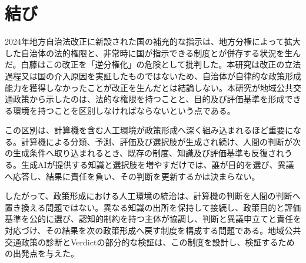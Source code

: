\section{結び}
\label{sec:ch10_conclusion}

2024年地方自治法改正に新設された国の補充的な指示は、地方分権によって拡大した自治体の法的権限と、非常時に国が指示できる制度とが併存する状況を生んだ\cite{chihojichiho2024,sangiin2024localgov}。白藤はこの改正を「逆分権化」の危険として批判した\cite{jichiken2024chihojichiho}。本研究は改正の立法過程又は国の介入原因を実証したものではないため、自治体が自律的な政策形成能力を獲得しなかったことが改正を生んだとは結論しない。本研究が地域公共交通政策から示したのは、法的な権限を持つことと、目的及び評価基準を形成できる環境を持つことを区別しなければならないという点である。

この区別は、計算機を含む人工環境が政策形成へ深く組み込まれるほど重要になる。計算機による分類、予測、評価及び選択肢が生成され続け、人間の判断が次の生成条件へ取り込まれるとき、既存の制度、知識及び評価基準も反復されうる。生成AIが提供する知識と選択肢を増やすだけでは、誰が目的を選び、異議へ応答し、結果に責任を負い、その判断を更新するかは決まらない。

したがって、政策形成における人工環境の統治は、計算機の判断を人間の判断へ置き換える問題ではない。異なる知識の出所を保持して接続し、政策目的と評価基準を公的に選び、認知的制約を持つ主体が協調し、判断と異議申立てと責任を対応づけ、その結果を次の政策形成へ戻す制度を構成する問題である。地域公共交通政策の診断とVerdictの部分的な検証は、この制度を設計し、検証するための出発点を与えた。


\printbibliography[heading=subbibliography,title={章末参考文献}]

